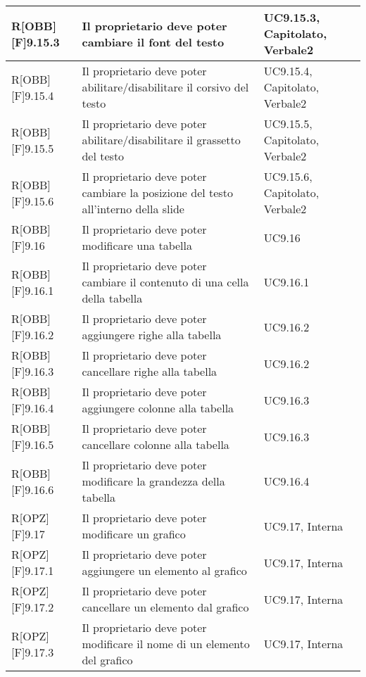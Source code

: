 \begin{table}[h]
\begin{tabular}{|p{}|p{}|p{}|}
		\end{tabular}
	\end{table}
	\newpage
	
	\begin{table}[h]
		\begin{tabular}{|p{}|p{}|p{}|}
			\midrule
			
R[OBB][F]9.15.3 & Il proprietario deve poter cambiare il \gls{font} del testo & UC9.15.3, Capitolato, Verbale2 \\ \midrule
R[OBB][F]9.15.4 & Il proprietario deve poter abilitare/disabilitare il corsivo del testo & UC9.15.4, Capitolato, Verbale2 \\ \midrule
R[OBB][F]9.15.5 & Il proprietario deve poter abilitare/disabilitare il grassetto del testo & UC9.15.5, Capitolato, Verbale2 \\ \midrule
R[OBB][F]9.15.6 & Il proprietario deve poter cambiare la posizione del testo all'interno della \gls{slide} & UC9.15.6, Capitolato, Verbale2 \\ \midrule
R[OBB][F]9.16 & Il proprietario deve poter modificare una tabella & UC9.16 \\ \midrule
R[OBB][F]9.16.1 & Il proprietario deve poter cambiare il contenuto di una cella della tabella & UC9.16.1 \\ \midrule
R[OBB][F]9.16.2 & Il proprietario deve poter aggiungere righe alla tabella & UC9.16.2 \\ \midrule
R[OBB][F]9.16.3 & Il proprietario deve poter cancellare righe alla tabella & UC9.16.2 \\ \midrule
R[OBB][F]9.16.4 & Il proprietario deve poter aggiungere colonne alla tabella & UC9.16.3 \\ \midrule
R[OBB][F]9.16.5 & Il proprietario deve poter cancellare colonne alla tabella & UC9.16.3 \\ \midrule
R[OBB][F]9.16.6 & Il proprietario deve poter modificare la grandezza della tabella & UC9.16.4 \\ \midrule
R[OPZ][F]9.17 & Il proprietario deve poter modificare un grafico & UC9.17, Interna \\ \midrule
R[OPZ][F]9.17.1 & Il proprietario deve poter aggiungere un elemento al grafico & UC9.17, Interna \\ \midrule
R[OPZ][F]9.17.2 & Il proprietario deve poter cancellare un elemento dal grafico & UC9.17, Interna \\ \midrule
R[OPZ][F]9.17.3 & Il proprietario deve poter modificare il nome di un elemento del grafico & UC9.17, Interna \\ \midrule

\end{tabular}
\end{table}
